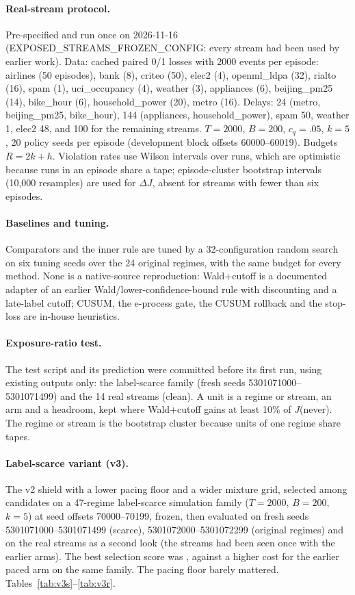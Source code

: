 \documentclass{article}
\theoremstyle{plain}
\theoremstyle{definition}
\begin{document}
\paragraph{Real-stream protocol.}
Pre-specified and run once on 2026-11-16 (EXPOSED\_STREAMS\_FROZEN\_CONFIG: every stream had been used by earlier work). Data: cached paired 0/1 losses with 2000 events per episode: airlines (50 episodes), bank (8), criteo (50), elec2 (4), openml\_ldpa (32), rialto (16), spam (1), uci\_occupancy (4), weather (3), appliances (6), beijing\_pm25 (14), bike\_hour (6), household\_power (20), metro (16). Delays: 24 (metro, beijing\_pm25, bike\_hour), 144 (appliances, household\_power), spam 50, weather 1, elec2 48, and 100 for the remaining streams. $T=2000$, $B=200$, $c_q=.05$, $k=5$, 20 policy seeds per episode (development block offsets 60000--60019). Budgets $R=2k+h$. Violation rates use Wilson intervals over runs, which are optimistic because runs in an episode share a tape; episode-cluster bootstrap intervals (10{,}000 resamples) are used for $\Delta J$, absent for streams with fewer than six episodes.

\paragraph{Baselines and tuning.}
Comparators and the inner rule are tuned by a 32-configuration random search on six tuning seeds over the 24 original regimes, with the same budget for every method. None is a native-source reproduction: Wald+cutoff is a documented adapter of an earlier Wald/lower-confidence-bound rule with discounting and a late-label cutoff; CUSUM, the e-process gate, the CUSUM rollback and the stop-loss are in-house heuristics.

\paragraph{Exposure-ratio test.}
The test script and its prediction were committed before its first run, using existing outputs only: the label-scarce family (fresh seeds 5301071000--5301071499) and the 14 real streams (clean). A unit is a regime or stream, an arm and a headroom, kept where Wald+cutoff gains at least 10\% of $J$(never). The regime or stream is the bootstrap cluster because units of one regime share tapes.

\paragraph{Label-scarce variant (v3).}\label{app:v3}
The v2 shield with a lower pacing floor and a wider mixture grid, selected among \VThreeNCand{} candidates on a 47-regime label-scarce simulation family ($T=2000$, $B=200$, $k=5$) at seed offsets 70000--70199, frozen, then evaluated on fresh seeds 5301071000--5301071499 (scarce), 5301072000--5301072299 (original regimes) and on the real streams as a second look (the streams had been seen once with the earlier arms). The best selection score was \VThreeBest, against a higher cost for the earlier paced arm on the same family. The pacing floor barely mattered. Tables~\ref{tab:v3s}--\ref{tab:v3r}.
\end{document}
